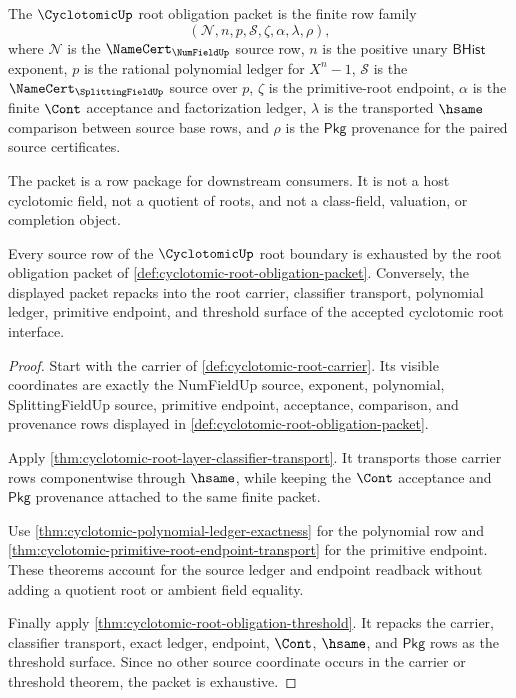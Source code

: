 \begin{definition}
\label{def:cyclotomic-root-obligation-packet}
The $\CyclotomicUp$ root obligation packet is the finite row family
$$
(\mathcal{N},n,p,\mathcal{S},\zeta,\alpha,\lambda,\rho),
$$
where $\mathcal{N}$ is the $\NameCert_{\NumFieldUp}$ source row, $n$ is the
positive unary $\mathsf{BHist}$ exponent, $p$ is the rational polynomial ledger
for $X^n-1$, $\mathcal{S}$ is the $\NameCert_{\SplittingFieldUp}$ source over
$p$, $\zeta$ is the primitive-root endpoint, $\alpha$ is the finite $\Cont$
acceptance and factorization ledger, $\lambda$ is the transported $\hsame$
comparison between source base rows, and $\rho$ is the $\mathsf{Pkg}$
provenance for the paired source certificates.

The packet is a row package for downstream consumers. It is not a host
cyclotomic field, not a quotient of roots, and not a class-field, valuation, or
completion object.
\end{definition}

\begin{theorem}
\label{thm:cyclotomic-root-source-row-exhaustion}
Every source row of the $\CyclotomicUp$ root boundary is exhausted by the root
obligation packet of \autoref{def:cyclotomic-root-obligation-packet}. Conversely,
the displayed packet repacks into the root carrier, classifier transport,
polynomial ledger, primitive endpoint, and threshold surface of the accepted
cyclotomic root interface.
\end{theorem}
\begin{proof}
Start with the carrier of \autoref{def:cyclotomic-root-carrier}. Its visible
coordinates are exactly the NumFieldUp source, exponent, polynomial,
SplittingFieldUp source, primitive endpoint, acceptance, comparison, and
provenance rows displayed in
\autoref{def:cyclotomic-root-obligation-packet}.

Apply \autoref{thm:cyclotomic-root-layer-classifier-transport}. It transports
those carrier rows componentwise through $\hsame$, while keeping the $\Cont$
acceptance and $\mathsf{Pkg}$ provenance attached to the same finite packet.

Use \autoref{thm:cyclotomic-polynomial-ledger-exactness} for the polynomial
row and \autoref{thm:cyclotomic-primitive-root-endpoint-transport} for the
primitive endpoint. These theorems account for the source ledger and endpoint
readback without adding a quotient root or ambient field equality.

Finally apply \autoref{thm:cyclotomic-root-obligation-threshold}. It repacks
the carrier, classifier transport, exact ledger, endpoint, $\Cont$, $\hsame$,
and $\mathsf{Pkg}$ rows as the threshold surface. Since no other source
coordinate occurs in the carrier or threshold theorem, the packet is exhaustive.
\end{proof}

